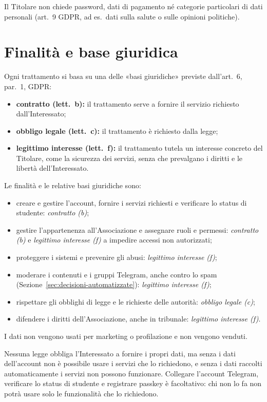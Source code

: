 \documentclass[legal]{polinetwork}
\begin{document}
Il Titolare non chiede password, dati di pagamento né categorie particolari di dati personali (art.~9 GDPR, ad es.~dati sulla salute o sulle opinioni politiche).

\section{Finalità e base giuridica}
\label{sec:finalita}

Ogni trattamento si basa su una delle «basi giuridiche» previste dall'art.~6, par.~1, GDPR:
\begin{itemize}
    \item \textbf{contratto (lett.~b):} il trattamento serve a fornire il servizio richiesto dall'Interessato;
    \item \textbf{obbligo legale (lett.~c):} il trattamento è richiesto dalla legge;
    \item \textbf{legittimo interesse (lett.~f):} il trattamento tutela un interesse concreto del Titolare, come la sicurezza dei servizi, senza che prevalgano i diritti e le libertà dell'Interessato.
\end{itemize}

Le finalità e le relative basi giuridiche sono:
\begin{itemize}
    \item creare e gestire l'account, fornire i servizi richiesti e verificare lo status di studente: \textit{contratto (b)};
    \item gestire l'appartenenza all'Associazione e assegnare ruoli e permessi: \textit{contratto (b)} e \textit{legittimo interesse (f)} a impedire accessi non autorizzati;
    \item proteggere i sistemi e prevenire gli abusi: \textit{legittimo interesse (f)};
    \item moderare i contenuti e i gruppi Telegram, anche contro lo spam (Sezione~\ref{sec:decisioni-automatizzate}): \textit{legittimo interesse (f)};
    \item rispettare gli obblighi di legge e le richieste delle autorità: \textit{obbligo legale (c)};
    \item difendere i diritti dell'Associazione, anche in tribunale: \textit{legittimo interesse (f)}.
\end{itemize}

I dati non vengono usati per marketing o profilazione e non vengono venduti.

Nessuna legge obbliga l'Interessato a fornire i propri dati, ma senza i dati dell'account non è possibile usare i servizi che lo richiedono, e senza i dati raccolti automaticamente i servizi non possono funzionare. Collegare l'account Telegram, verificare lo status di studente e registrare passkey è facoltativo: chi non lo fa non potrà usare solo le funzionalità che lo richiedono.
\end{document}
